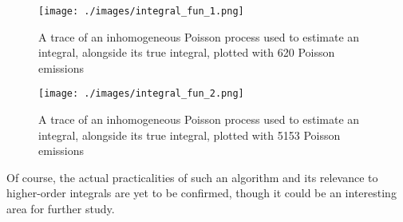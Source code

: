 \begin{figure}
\centering
\texttt{[image: ./images/integral\_fun\_1.png]}
\caption{A trace of an inhomogeneous Poisson process used to estimate an integral, alongside its true integral, plotted with 620 Poisson emissions}
\label{integral_fun_1}
\end{figure}

\begin{figure}
\centering
\texttt{[image: ./images/integral\_fun\_2.png]}
\caption{A trace of an inhomogeneous Poisson process used to estimate an integral, alongside its true integral, plotted with 5153 Poisson emissions}
\label{integral_fun_2}
\end{figure}

Of course, the actual practicalities of such an algorithm and its relevance to higher-order integrals are yet to be confirmed, though it could be an interesting area for further study.